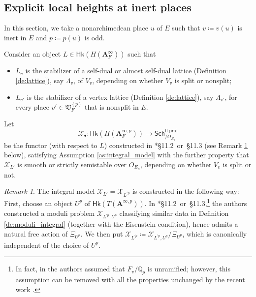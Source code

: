 \documentclass[12pt]{amsart}
\numberwithin{equation}{section}
\theoremstyle{plain}
\theoremstyle{definition}
\theoremstyle{remark}
\newtheorem{remark}[proposition]{Remark}
\renewcommand{\b}[1]{\mathbf{#1}}
\renewcommand{\c}[1]{\mathcal{#1}}
\renewcommand{\d}[1]{\mathbb{#1}}
\newcommand{\f}[1]{\mathfrak{#1}}
\renewcommand{\r}[1]{\mathrm{#1}}
\renewcommand{\sf}[1]{\mathsf{#1}}
\renewcommand{\(}{\left(}
\renewcommand{\)}{\right)}
\newcommand{\bA}{\b A}
\newcommand{\cX}{\c X}
\newcommand{\dQ}{\d Q}
\newcommand{\fV}{\f V}
\newcommand{\proj}{\r{fl.proj}}
\newcommand{\Sch}{\sf{Sch}}
\newcommand{\Hk}{\sf{Hk}}
\begin{document}
\subsection{Explicit local heights at inert places}
\label{ss:height_inert}

In this section, we take a nonarchimedean place $u$ of $E$ such that $v\coloneqq v(u)$ is inert in $E$ and $p\coloneqq p(u)$ is odd.

Consider an object $L\in\Hk(H(\bA_F^\infty))$ such that
\begin{itemize}
  \item $L_v$ is the stabilizer of a self-dual or almost self-dual lattice (Definition \ref{de:lattice}), say $\Lambda_v$, of $V_v$, depending on whether $V_v$ is split or nonsplit;

  \item $L_{v'}$ is the stabilizer of a vertex lattice (Definition \ref{de:lattice}), say $\Lambda_{v'}$, for every place $v'\in\fV_F^{(p)}$ that is nonsplit in $E$.
\end{itemize}

Let
\[
\cX_\bullet\colon \Hk(H(\bA_F^{\infty,p}))\to\Sch^\proj_{/O_{E_u}}
\]
be the functor (with respect to $L$) constructed in \cite{LZ22}*{\S11.2~or~\S11.3} (see Remark \ref{re:moduli_integral} below), satisfying Assumption \ref{as:integral_model} with the further property that $\cX_{L'}$ is smooth or strictly semistable over $O_{E_u}$, depending on whether $V_v$ is split or not.


\begin{remark}\label{re:moduli_integral}
The integral model $\cX_{L'}=\cX_{L^{\prime p}}$ is constructed in the following way: First, choose an object $U^p$ of $\Hk(T(\bA^{\infty,p}))$. In \cite{LZ22}*{\S11.2~or~\S11.3},\footnote{In fact, in \cite{LZ22} the authors assumed that $F_v/\dQ_p$ is unramified; however, this assumption can be removed with all the properties unchanged by the recent work \cite{LMZ}.} the authors constructed a moduli problem $\cX_{L^{\prime p},U^p}$ classifying similar data in Definition \ref{de:moduli_integral} (together with the Eisenstein condition), hence admits a natural free action of $\Xi_{U^p}$. We then put $\cX_{L^{\prime p}}\coloneqq\cX_{L^{\prime p},U^p}/\Xi_{U^p}$, which is canonically independent of the choice of $U^p$.
\end{remark}
\end{document}
